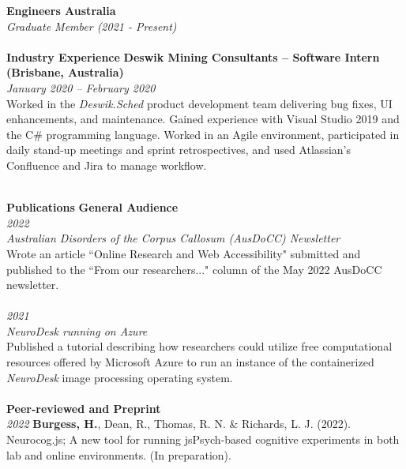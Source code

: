 \documentclass{article}
\begin{document}
  \large\textbf{Engineers Australia} \\
  \textit{Graduate Member (2021 - Present)} \\
  \\

  \large\textbf{Industry Experience}
  \large\textbf{Deswik Mining Consultants – Software Intern (Brisbane, Australia)} \\
  \textit{January 2020 – February 2020} \\
  Worked in the \textit{Deswik.Sched} product development team delivering bug fixes, UI enhancements, and maintenance. Gained experience with Visual Studio 2019 and the C\# programming language. Worked in an Agile environment, participated in daily stand-up meetings and sprint retrospectives, and used Atlassian’s Confluence and Jira to manage workflow. \\ 
  \\

                      \pagebreak

  \large\textbf{Publications}
  \large\textbf{General Audience} \\
  \large\textit{2022} \\
  \large\textit{Australian Disorders of the Corpus Callosum (AusDoCC) Newsletter} \\
  Wrote an article ``Online Research and Web Accessibility" submitted and published to the ``From our researchers..." column of the May 2022 AusDoCC newsletter. \\  
  \\
                      
  \large\textit{2021} \\
  \large\textit{NeuroDesk running on Azure}  \\  
  Published a tutorial describing how researchers could utilize free computational resources offered by Microsoft Azure to run an instance of the containerized \textit{NeuroDesk} image processing operating system. \\
  \\
                      
  \large\textbf{Peer-reviewed and Preprint} \\
  \large\textit{2022}
  \textbf{Burgess, H.}, Dean, R., Thomas, R. N. \& Richards, L. J. (2022). Neurocog.js; A new tool for running jsPsych-based cognitive experiments in both lab and online environments. (In preparation). \\
  \\
\end{document}
